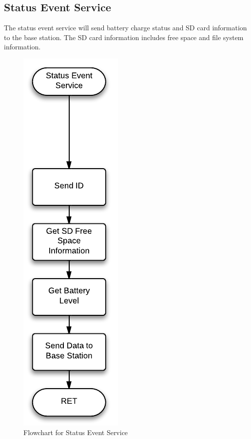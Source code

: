 \subsection{Status Event Service}
The status event service will send battery charge status and SD card information to the base station. The SD card information includes free space and file system information.
\begin{figure}[H]
	\centering
	\includegraphics[scale=0.8]{img/StatusEventService}
	\caption{Flowchart for Status Event Service \label{fig:statusMode}}
\end{figure}
